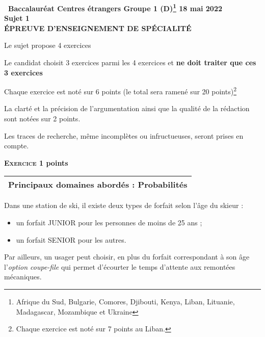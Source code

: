 \documentclass[10pt,a4paper]{article}
\begin{document}
\label{GroupeI1}

\pagestyle{fancy}
\thispagestyle{empty}

\begin{center}{\Large\textbf{\decofourleft~Baccalauréat Centres étrangers Groupe 1  (D)\footnote{Afrique du Sud, Bulgarie, Comores, Djibouti, Kenya, Liban, Lituanie, Madagascar, Mozambique et Ukraine} 18 mai 2022~\decofourright\\[7pt]  Sujet 1\\[7pt] ÉPREUVE D'ENSEIGNEMENT DE SPÉCIALITÉ}}
\end{center}

\vspace{0,25cm}

Le sujet propose 4 exercices

Le candidat choisit 3 exercices parmi les 4 exercices et \textbf{ne doit traiter que ces 3 exercices}

Chaque exercice est noté sur 6 points (le total sera ramené sur 20 points)\footnote{Chaque exercice est noté sur 7 points au Liban.}

La clarté et la précision de l'argumentation ainsi que la qualité de la rédaction sont notées sur 2 points.

Les traces de recherche, même incomplètes ou infructueuses, seront prises en compte.

\bigskip

\textbf{\textsc{Exercice 1}  points\hfill }

\medskip

\begin{tabularx}{\linewidth}{|X|}\hline
\textbf{Principaux domaines abordés :} Probabilités\\ \hline
\end{tabularx}

\medskip

Dans une station de ski, il existe deux types de forfait selon l'âge du skieur :

\begin{itemize}
\item un forfait JUNIOR pour les personnes de moins de 25 ans ;
\item un forfait SENIOR pour les autres.
\end{itemize}

 Par ailleurs, un usager peut choisir, en plus du forfait correspondant à son âge l'\emph{option  coupe-file} qui permet d'écourter le temps d'attente aux remontées mécaniques.
\end{document}
